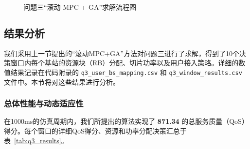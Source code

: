 \begin{figure}[htbp]
  \centering
  \caption{问题三“滚动 MPC + GA”求解流程图}
  \label{fig:flow_q3}
\end{figure}

\subsection{结果分析}
我们采用上一节提出的“滚动MPC+GA”方法对问题三进行了求解，得到了10个决策窗口内每个基站的资源块（RB）分配、切片功率以及用户接入策略。详细的数值结果记录在代码附录的 \texttt{q3\_user\_bs\_mapping.csv} 和 \texttt{q3\_window\_results.csv} 文件中。本节将对这些结果进行分析。

\subsubsection{总体性能与动态适应性}
在1000ms的仿真周期内，我们所提出的算法实现了 \textbf{871.34} 的总服务质量（QoS）得分。每个窗口的详细QoS得分、资源和功率分配决策汇总于表~\ref{tab:q3_results}。

